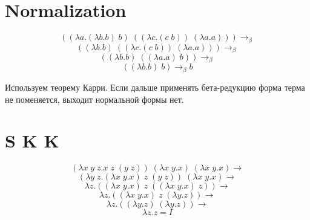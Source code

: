 \documentclass[a4paper,12pt]{article}
\begin{document}
\section*{Normalization}
\[
((\lambda a. (\lambda b. b) \; b) \; ((\lambda c. (c \; b)) \; (\lambda a. a))) \to_\beta
\]
\[
((\lambda b. b) \; ((\lambda c. (c \; b)) \; (\lambda a. a))) \to_\beta
\]
\[
((\lambda b. b) \; ((\lambda a. a) \; b)) \to_\beta
\]
\[
((\lambda b. b) \; b) \to_\beta b
\]

\noindent
Используем теорему Карри. Если дальше применять бета-редукцию форма терма не поменяется, выходит нормальной формы нет.

\section*{S K K}
\[
(\lambda x \; y \; z. x \; z \; (y \; z)) \; (\lambda x \; y. x) \; (\lambda x \; y. x) \to
\]
\[
(\lambda y \; z. (\lambda x \; y. x) \; z \; (y \; z)) \; (\lambda x \; y. x) \to
\]
\[
\lambda z. ((\lambda x \; y. x) \; z \; ((\lambda x \; y. x) \; z)) \to
\]
\[
\lambda z. ((\lambda x \; y. x) \; z \; (\lambda y. z)) \to
\]
\[
\lambda z. ((\lambda y. z) \; (\lambda y. z)) \to
\]
\[
\lambda z. z = I
\]
\end{document}
